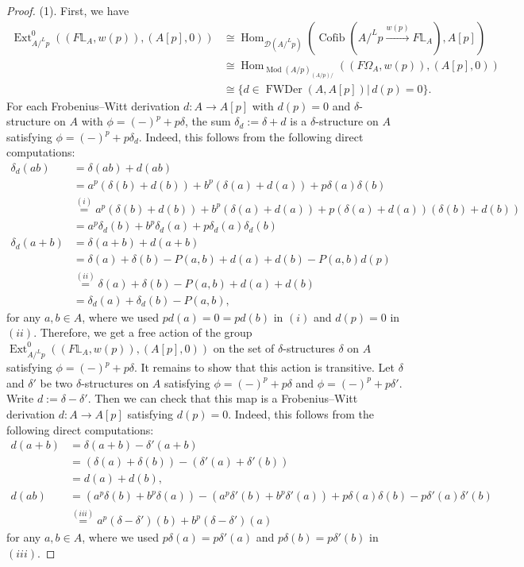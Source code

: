 \documentclass[11pt, a4paper]{amsart}
\theoremstyle{plain}
\theoremstyle{definition}
\begin{document}
\begin{proof}
    (1). First, we have \begin{align*}
        \operatorname{Ext}^0_{A/^Lp}((F\mathbb L_A,w(p)),(A[p],0))&\cong \operatorname{Hom}_{\mathcal{D}(A/^Lp)}(\operatorname{Cofib}(A/^Lp\xrightarrow[]{w(p)}F\mathbb L_A),A[p])\\&\cong \operatorname{Hom}_{\operatorname{Mod}(A/p)_{(A/p)/}}((F\Omega_A,w(p)),(A[p],0))\\&\cong \{d\in\operatorname{FWDer}(A,A[p])|\, d(p)=0 \}.
    \end{align*}
    For each Frobenius--Witt derivation $d:A\to A[p]$ with $d(p)=0$ and $\delta$-structure on $A$ with $\phi=(-)^p+p\delta$, the sum $\delta_d:=\delta+d$ is a $\delta$-structure on $A$ satisfying $\phi=(-)^p+p\delta_d$. Indeed, this follows from the following direct computations:
    \begin{align*}
        \delta_d(ab)&=\delta(ab)+d(ab)\\&=a^p(\delta(b)+d(b))+b^p(\delta(a)+d(a))+p\delta(a)\delta(b)\\&\overset{(i)}{=}a^p(\delta(b)+d(b))+b^p(\delta(a)+d(a))+p(\delta(a)+d(a))(\delta(b)+d(b))\\&=a^p\delta_d(b)+b^p\delta_d(a)+p\delta_d(a)\delta_d(b)\\
    \delta_d(a+b)&=\delta(a+b)+d(a+b)\\&=\delta(a)+\delta(b)-P(a,b)+d(a)+d(b)-P(a,b)d(p)\\&\overset{(ii)}{=}\delta(a)+\delta(b)-P(a,b)+d(a)+d(b)\\
        &=\delta_d(a)+\delta_d(b)-P(a,b),
    \end{align*}
    for any $a,b\in A$, where we used $pd(a)=0=pd(b)$ in $(i)$ and $d(p)=0$ in $(ii)$. Therefore, we get a free action of the group $ \operatorname{Ext}^0_{A/^Lp}((F\mathbb L_A,w(p)),(A[p],0))$ on the set of $\delta$-structures $\delta$ on $A$ satisfying $\phi=(-)^p+p\delta$. It remains to show that this action is transitive. Let $\delta$ and $\delta'$ be two $\delta$-structures on $A$ satisfying $\phi=(-)^p+p\delta$ and $\phi=(-)^p+p\delta'$. Write $d:=\delta-\delta'$. Then we can check that this map is a Frobenius--Witt derivation $d:A\to A[p]$ satisfying $d(p)=0$. Indeed, this follows from the following direct computations:
    \begin{align*}
        d(a+b)&=\delta(a+b)-\delta'(a+b)\\&=(\delta(a)+\delta(b))-(\delta'(a)+\delta'(b))\\&=d(a)+d(b),\\
        d(ab)&=(a^p\delta(b)+b^p\delta(a))-(a^p\delta'(b)+b^p\delta'(a))+p\delta(a)\delta(b)-p\delta'(a)\delta'(b)\\&\overset{(iii)}{=}a^p(\delta-\delta')(b)+b^p(\delta-\delta')(a)
    \end{align*}
    for any $a,b\in A$, where we used $p\delta(a)=p\delta'(a)$ and $p\delta(b)=p\delta'(b)$ in $(iii)$.


\end{proof}
\end{document}
